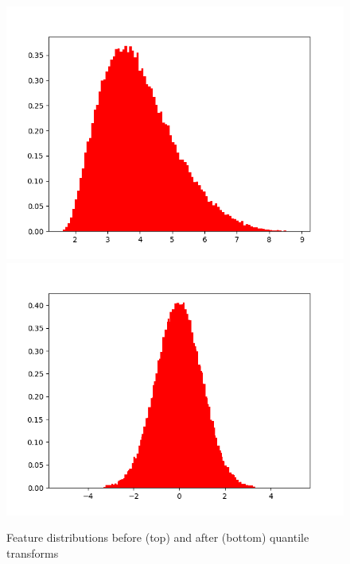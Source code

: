 \begin{figure}[htb]
\begin{minipage}{.3\textwidth}
        \centering
        \includegraphics[width=.99\textwidth,trim={3cm 0 0 0},clip]{Chapters/Ch3-Simulations/normalizing_flows/pics/MeetingFigures/Bobby/QT/feature2_noQT.png}
        \includegraphics[width=.99\textwidth,trim={3cm 0 0 0},clip]{Chapters/Ch3-Simulations/normalizing_flows/pics/MeetingFigures/Bobby/QT/feature2.png}

    \end{minipage}%
    \caption[Placeholder Short text]{Feature distributions before (top) and after (bottom) quantile transforms}
    \label{fig:16features5}
\end{figure}

